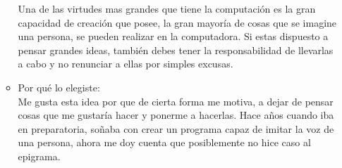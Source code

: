 \documentclass{article}
\begin{document}
\begin{itemize}
\begin{itemize}
        Una de las virtudes mas grandes que tiene la computación es la gran capacidad de creación que posee, la gran mayoría de cosas que se imagine una persona, se pueden realizar en la computadora. Si estas dispuesto a pensar grandes ideas, también debes tener la responsabilidad de llevarlas a cabo y no renunciar a ellas por simples excusas.
        \item Por qué lo elegiste:\\
        Me gusta esta idea por que de cierta forma me motiva, a dejar de pensar cosas que me gustaría hacer y ponerme a hacerlas. Hace años cuando iba en preparatoria, soñaba con crear un programa capaz de imitar la voz de una persona, ahora me doy cuenta que posiblemente no hice caso al epigrama.
    \end{itemize}
\end{itemize}
\end{document}
